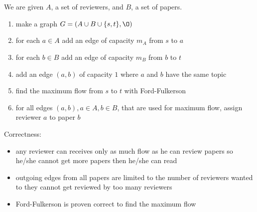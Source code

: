\documentclass[12pt]{article}
\begin{document}
\section{} %
We are given $A$, a set of reviewers, and $B$, a set of papers.

\begin{enumerate}
	\item make a graph $G = (A \cup B \cup \{s, t\}, \O)$
	\item for each $a \in A$ add an edge of capacity $m_A$ from $s$ to $a$
	\item for each $b \in B$ add an edge of capacity $m_B$ from $b$ to $t$
	\item add an edge $(a, b)$ of capacity $1$ where $a$ and $b$ have the same topic
	\item find the maximum flow from $s$ to $t$ with Ford-Fulkerson
	\item for all edges $(a, b), a \in A, b \in B$, that are used for maximum flow, assign reviewer $a$ to paper $b$
\end{enumerate}

Correctness:
\begin{itemize}
	\item any reviewer can receives only as much flow as he can review papers so he/she cannot get more papers then he/she can read
	\item outgoing edges from all papers are limited to the number of reviewers wanted to they cannot get reviewed by too many reviewers
	\item Ford-Fulkerson is proven correct to find the maximum flow
\end{itemize}

\section{} %
\end{document}
